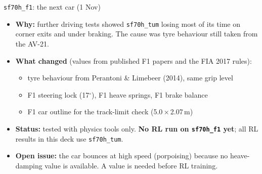 \documentclass[aspectratio=169,10pt]{beamer}
\begin{document}
\begin{frame}{\texttt{sf70h\_f1}: the next car (1 Nov)}
  \begin{itemize}
    \item \textbf{Why:} further driving tests showed \texttt{sf70h\_tum} losing most of its time on corner exits and under braking. The cause was tyre behaviour still taken from the AV-21.
    \item \textbf{What changed} (values from published F1 papers and the FIA 2017 rules):
    \begin{itemize}
      \item tyre behaviour from Perantoni \& Limebeer (2014), same grip level
      \item F1 steering lock (17$^\circ$), F1 heave springs, F1 brake balance
      \item F1 car outline for the track-limit check (5.0\,$\times$\,2.07\,m)
    \end{itemize}
    \item \textbf{Status:} tested with physics tools only. \textbf{No RL run on \texttt{sf70h\_f1} yet}; all RL results in this deck use \texttt{sf70h\_tum}.
    \item \textbf{Open issue:} the car bounces at high speed (porpoising) because no heave-damping value is available. A value is needed before RL training.
  \end{itemize}
\end{frame}
\end{document}
